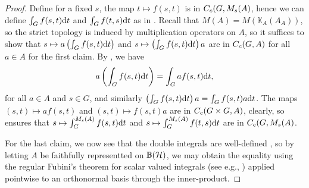 \begin{proof}
Define for a fixed $s$, the map $t \mapsto f(s,t)$ is in $C_c(G,M_s(A)$, hence we can define $\int_G f(s,t) \mathrm{d} t$ and $\int_G f(t,s) \mathrm{d} t$ as in . Recall that $M(A) = M(\mathbb{K}_A(A_A))$, so the strict topology is induced by multiplication operators on $A$, so it suffices to show that $s \mapsto a \left(\int_Gf(s,t) \mathrm{d} t\right)$ and $s \mapsto \left(\int_G f(s,t) \mathrm{d} t\right) a $ are in $C_c(G,A)$ for all $ a \in A$ for the first claim. By , we have 
\begin{align*}
	a \left( \int_G f(s,t) \mathrm{d} t \right) = \int_G a f(s,t) \mathrm{d} t,
\end{align*}
for all $a \in A$ and $s \in G$, and similarly $\left( \int_G f(s,t) \mathrm{d} t \right)a = \int_G f(s,t) a \mathrm{d} t$. The maps $(s,t) \mapsto a f(s,t)$ and $(s,t) \mapsto f(s,t) a$ are in $C_c(G \times G , A)$, clearly, so  ensures that $s \mapsto \int_G^{M_s(A)} f(s,t) \mathrm{d} t$ and $s \mapsto \int_G ^{M_s(A)} f(t,s) \mathrm{d} t$ are in $C_c(G,M_s(A)$.

For the last claim, we now see that the double integrals are well-defined , so by letting $A$ be faithfully representted on $\mathbb{B}(\mathcal{H})$, we may obtain the equality using the regular Fubini's theorem for scalar valued integrals (see e.g., \cite{schilling}) applied pointwise to an orthonormal basis through the inner-product.
\end{proof}


